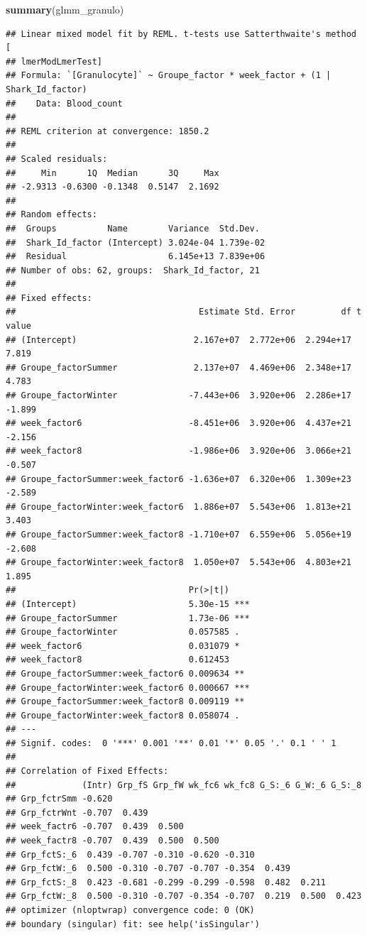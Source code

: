 \documentclass[
]{article}
\newenvironment{Shaded}{\begin{snugshade}}{\end{snugshade}}
\newcommand{\FunctionTok}[1]{\textcolor[rgb]{0.13,0.29,0.53}{\textbf{#1}}}
\newcommand{\NormalTok}[1]{#1}
\begin{document}
\begin{Shaded}
\begin{Highlighting}[]
\FunctionTok{summary}\NormalTok{(glmm\_granulo)}
\end{Highlighting}
\end{Shaded}

\begin{verbatim}
## Linear mixed model fit by REML. t-tests use Satterthwaite's method [
## lmerModLmerTest]
## Formula: `[Granulocyte]` ~ Groupe_factor * week_factor + (1 | Shark_Id_factor)
##    Data: Blood_count
## 
## REML criterion at convergence: 1850.2
## 
## Scaled residuals: 
##     Min      1Q  Median      3Q     Max 
## -2.9313 -0.6300 -0.1348  0.5147  2.1692 
## 
## Random effects:
##  Groups          Name        Variance  Std.Dev. 
##  Shark_Id_factor (Intercept) 3.024e-04 1.739e-02
##  Residual                    6.145e+13 7.839e+06
## Number of obs: 62, groups:  Shark_Id_factor, 21
## 
## Fixed effects:
##                                    Estimate Std. Error         df t value
## (Intercept)                       2.167e+07  2.772e+06  2.294e+17   7.819
## Groupe_factorSummer               2.137e+07  4.469e+06  2.348e+17   4.783
## Groupe_factorWinter              -7.443e+06  3.920e+06  2.286e+17  -1.899
## week_factor6                     -8.451e+06  3.920e+06  4.437e+21  -2.156
## week_factor8                     -1.986e+06  3.920e+06  3.066e+21  -0.507
## Groupe_factorSummer:week_factor6 -1.636e+07  6.320e+06  1.309e+23  -2.589
## Groupe_factorWinter:week_factor6  1.886e+07  5.543e+06  1.813e+21   3.403
## Groupe_factorSummer:week_factor8 -1.710e+07  6.559e+06  5.056e+19  -2.608
## Groupe_factorWinter:week_factor8  1.050e+07  5.543e+06  4.803e+21   1.895
##                                  Pr(>|t|)    
## (Intercept)                      5.30e-15 ***
## Groupe_factorSummer              1.73e-06 ***
## Groupe_factorWinter              0.057585 .  
## week_factor6                     0.031079 *  
## week_factor8                     0.612453    
## Groupe_factorSummer:week_factor6 0.009634 ** 
## Groupe_factorWinter:week_factor6 0.000667 ***
## Groupe_factorSummer:week_factor8 0.009119 ** 
## Groupe_factorWinter:week_factor8 0.058074 .  
## ---
## Signif. codes:  0 '***' 0.001 '**' 0.01 '*' 0.05 '.' 0.1 ' ' 1
## 
## Correlation of Fixed Effects:
##             (Intr) Grp_fS Grp_fW wk_fc6 wk_fc8 G_S:_6 G_W:_6 G_S:_8
## Grp_fctrSmm -0.620                                                 
## Grp_fctrWnt -0.707  0.439                                          
## week_factr6 -0.707  0.439  0.500                                   
## week_factr8 -0.707  0.439  0.500  0.500                            
## Grp_fctS:_6  0.439 -0.707 -0.310 -0.620 -0.310                     
## Grp_fctW:_6  0.500 -0.310 -0.707 -0.707 -0.354  0.439              
## Grp_fctS:_8  0.423 -0.681 -0.299 -0.299 -0.598  0.482  0.211       
## Grp_fctW:_8  0.500 -0.310 -0.707 -0.354 -0.707  0.219  0.500  0.423
## optimizer (nloptwrap) convergence code: 0 (OK)
## boundary (singular) fit: see help('isSingular')
\end{verbatim}
\end{document}
